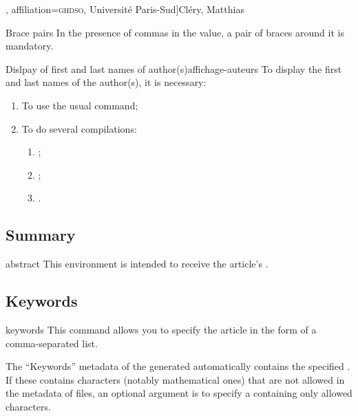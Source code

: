 \documentclass[english,nolocaltoc]{nwejmart}
\newtheorem[style=definition]{fact}
\newtheorem[title=experience]{experience}
\newtheorem[title-plural=rings]{ring}
\newtheorem[title=ideal,title-plural=ideals]{ideal}
\begin{document}
\begin{bodycode}
\author[
  affiliation={Laboratoire \textsc{sphere}, Universit\'e Paris Diderot}
  ]{Bustamante, Martha-Cecilia}
\author[
  affiliation=[aff2]{\textsc{lpma}, Universit\'e Pierre et Marie Curie},
  affiliation={\textsc{ghdso}, Universit\'e Paris-Sud}]{Cl\'ery, Matthias}
\author[
  affiliationtagged={aff2}
]{Mazliak, Laurent}
\end{bodycode}

\begin{dbwarning}{Brace pairs
    }{}
  In the presence of commas in the  value, a pair of braces
  around it is mandatory.
\end{dbwarning}

\begin{dbwarning}{Dislpay of first and last names of author(s)}{affichage-auteurs}
  To display the first and last names of the author(s), it is
  necessary:
  \begin{enumerate}
  \item To use the usual  command;
  \item To do several compilations\suitecompilations{}:
    \begin{enumerate}
    \item {} ;
    \item {} ;
    \item {}.
    \end{enumerate}
  \end{enumerate}
\end{dbwarning}

\subsection{Summary}
\label{sec-resume}

\begin{docEnvironment}[doc description=\mandatory,doclang/environment content=abstract]{abstract}{}
  This  environment is intended to receive the article's .
\end{docEnvironment}

\subsection{Keywords}

\begin{docCommand}[doc
  description=\mandatory]{keywords}{}
  This command allows you to specify the article   in
  the form of a comma-separated list.

  The \enquote{Keywords} metadata of the generated  automatically 
  contains the specified .  If these contains
  characters (notably mathematical ones) that are not allowed in the
  metadata of   files, an optional argument is to specify a
   containing only allowed characters.
\end{docCommand}
\end{document}
